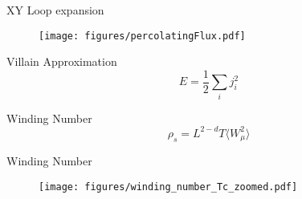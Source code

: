 \documentclass[10pt]{beamer}
\begin{document}
\begin{frame}{XY Loop expansion}
    \begin{figure}[h!]
        \centering
            \texttt{[image: figures/percolatingFlux.pdf]}
    \end{figure}
\end{frame}

\begin{frame}{Villain Approximation}
    \begin{equation*}
        E = \frac{1}{2} \sum_i j_i^2
    \end{equation*}
\end{frame}

\begin{frame}{Winding Number}
    \begin{equation*}
        \rho_s = L^{2 - d} T \langle W_\mu^2 \rangle 
    \end{equation*}
\end{frame}

\begin{frame}{Winding Number}
    \begin{figure}[h!]
        \centering
            \texttt{[image: figures/winding\_number\_Tc\_zoomed.pdf]}
    \end{figure}
\end{frame}
\end{document}
